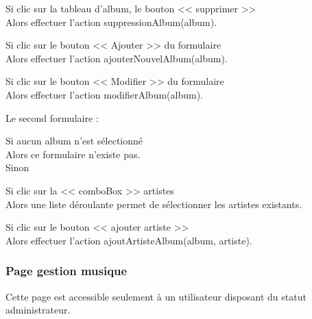 			\begin{paragraphe}
				Si clic sur la tableau d'album, le bouton << supprimer >> \\
				Alors effectuer l'action suppressionAlbum(album).
			\end{paragraphe}

			\begin{paragraphe}
				Si clic sur le bouton << Ajouter >> du formulaire \\
				Alors effectuer l'action ajouterNouvelAlbum(album).
			\end{paragraphe}

			\begin{paragraphe}
				Si clic sur le bouton << Modifier >> du formulaire \\
				Alors effectuer l'action modifierAlbum(album).
			\end{paragraphe}

			\begin{paragraphe}
				Le second formulaire :
			\end{paragraphe}

			\begin{paragraphe}
				Si aucun album n'est sélectionné \\
				Alors ce formulaire n'existe pas. \\
				Sinon
			\end{paragraphe}

			\begin{paragraphe}
				Si clic sur la << comboBox >> artistes \\
				Alors une liste déroulante permet de sélectionner les artistes existants.
			\end{paragraphe}

			\begin{paragraphe}
				Si clic sur le bouton << ajouter artiste >> \\
				Alors effectuer l'action ajoutArtisteAlbum(album, artiste).
			\end{paragraphe}

		\subsubsection{Page gestion musique}

			\begin{paragraphe}
				Cette page est accessible seulement à un utilisateur disposant du statut administrateur.
			\end{paragraphe}


